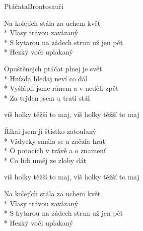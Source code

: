 \documentclass[10.5pt]{book}
\begin{document}
\begin{poem}{Ptáčata}{Brontosauři}

\settowidth{\versewidth}{Chceš-li, trap se, že ti v kapse}

Na kolejích stála za uchem květ\\*
Vlasy trávou zavázaný\\*
S kytarou na zádech strun už jen pět\\*
Hezký voči uplakaný

Opuštěnejch ptáčat plnej je svět\\*
Hnízda hledaj neví co dál\\*
Vyšlápli jsme ránem a v neděli zpět\\*
Za tejden jsem u trati stál

víš holky těžší to maj, víš holky těžší to maj

Říkal jsem jí štístko zatoulaný\\*
Vždycky smála se a začala hrát\\*
O potocích v trávě a o znamení\\*
Co lidi uměj ze zloby dát

víš holky těžší to maj, víš holky těžší to maj

Na kolejích stála za uchem květ\\*
Vlasy trávou zavázaný\\*
S kytarou na zádech strun už jen pět\\*
Hezký voči uplakaný

\end{poem}
\end{document}
